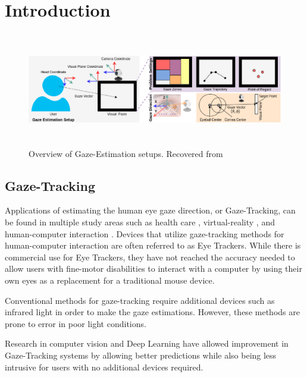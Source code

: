 
\chapter{Introduction}
\label{Chap1}

\begin{figure}
    \centering
    \includegraphics[width=\textwidth,height=5cm]{img/figures/gaze_estimation_setup.png}
    \caption{Overview of Gaze-Estimation setups. Recovered from \cite{survey_automatic_gaze_ghosh}}
    \label{gaze_estimation_setup}
 \end{figure}


\section{Gaze-Tracking}
Applications of estimating the human eye gaze direction, or Gaze-Tracking, can be found in multiple study areas such as health care \cite{EyeTrackMedical}, virtual-reality \cite{EyeVR}, and human-computer interaction \cite{Gaze-Controlled-Web}. Devices that utilize gaze-tracking methods for human-computer interaction are often referred to as Eye Trackers. While there is commercial use for Eye Trackers, they have not reached the accuracy needed to allow users with fine-motor disabilities to interact with a computer by using their own eyes as a replacement for a traditional mouse device.

Conventional methods for gaze-tracking require additional devices such as infrared light in order to make the gaze estimations. However, these methods are prone to error in poor light conditions.

Research in computer vision and Deep Learning have allowed improvement in Gaze-Tracking systems by allowing better predictions while also being less intrusive for users with no additional devices required.


